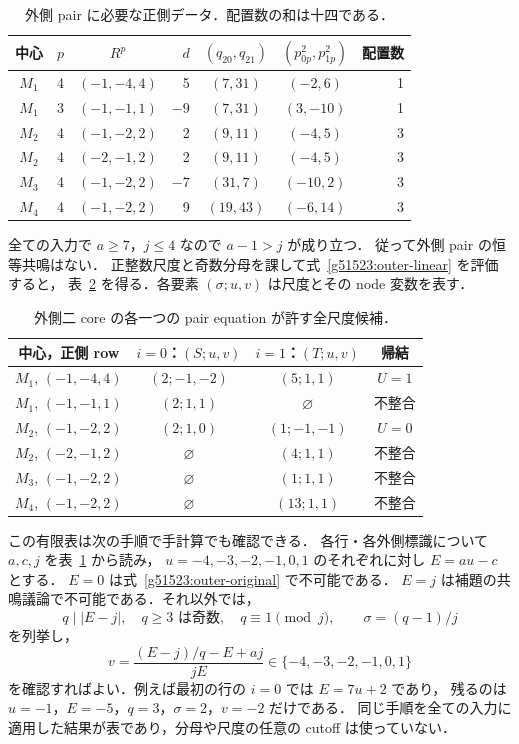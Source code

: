 \begin{table}[htbp]
\centering\small
\begin{tabular}{c|c|c|r|c|c|r}
中心&$p$&$R^p$&$d$&$(q_{20},q_{21})$&$(p^2_{0p},p^2_{1p})$&配置数\\\hline
$M_1$&4&$(-1,-4,4)$&5&$(7,31)$&$(-2,6)$&1\\
$M_1$&3&$(-1,-1,1)$&$-9$&$(7,31)$&$(3,-10)$&1\\
$M_2$&4&$(-1,-2,2)$&2&$(9,11)$&$(-4,5)$&3\\
$M_2$&4&$(-2,-1,2)$&2&$(9,11)$&$(-4,5)$&3\\
$M_3$&4&$(-1,-2,2)$&$-7$&$(31,7)$&$(-10,2)$&3\\
$M_4$&4&$(-1,-2,2)$&9&$(19,43)$&$(-6,14)$&3
\end{tabular}
\caption{外側 pair に必要な正側データ．配置数の和は十四である．}
\label{g51523:positive-profiles}
\end{table}

全ての入力で $a\ge7$，$j\le4$ なので $a-1>j$ が成り立つ．
従って外側 pair の恒等共鳴はない．
正整数尺度と奇数分母を課して式~\eqref{g51523:outer-linear} を評価すると，
表~\ref{g51523:scale-table} を得る．各要素 $(\sigma;u,v)$ は尺度とその node 変数を表す．

\begin{table}[htbp]
\centering\small
\begin{tabular}{c|c|c|c}
中心，正側 row&$i=0$：$(S;u,v)$&$i=1$：$(T;u,v)$&帰結\\\hline
$M_1$, $(-1,-4,4)$&$(2;-1,-2)$&$(5;1,1)$&$U=1$\\
$M_1$, $(-1,-1,1)$&$(2;1,1)$&$\varnothing$&不整合\\
$M_2$, $(-1,-2,2)$&$(2;1,0)$&$(1;-1,-1)$&$U=0$\\
$M_2$, $(-2,-1,2)$&$\varnothing$&$(4;1,1)$&不整合\\
$M_3$, $(-1,-2,2)$&$\varnothing$&$(1;1,1)$&不整合\\
$M_4$, $(-1,-2,2)$&$\varnothing$&$(13;1,1)$&不整合
\end{tabular}
\caption{外側二 core の各一つの pair equation が許す全尺度候補．}
\label{g51523:scale-table}
\end{table}

この有限表は次の手順で手計算でも確認できる．
各行・各外側標識について $a,c,j$ を表~\ref{g51523:positive-profiles} から読み，
$u=-4,-3,-2,-1,0,1$ のそれぞれに対し $E=au-c$ とする．
$E=0$ は式~\eqref{g51523:outer-original} で不可能である．
$E=j$ は補題の共鳴議論で不可能である．それ以外では，
\[
 q\mid |E-j|,\quad q\ge3\text{ は奇数},\quad q\equiv1\pmod j,
 \qquad \sigma=(q-1)/j
\]
を列挙し，
\begin{equation}\label{g51523:node-from-divisor}
 v=\frac{(E-j)/q-E+aj}{jE}
 \in\{-4,-3,-2,-1,0,1\}
\end{equation}
を確認すればよい．例えば最初の行の $i=0$ では $E=7u+2$ であり，
残るのは $u=-1$，$E=-5$，$q=3$，$\sigma=2$，$v=-2$ だけである．
同じ手順を全ての入力に適用した結果が表であり，分母や尺度の任意の cutoff は使っていない．


